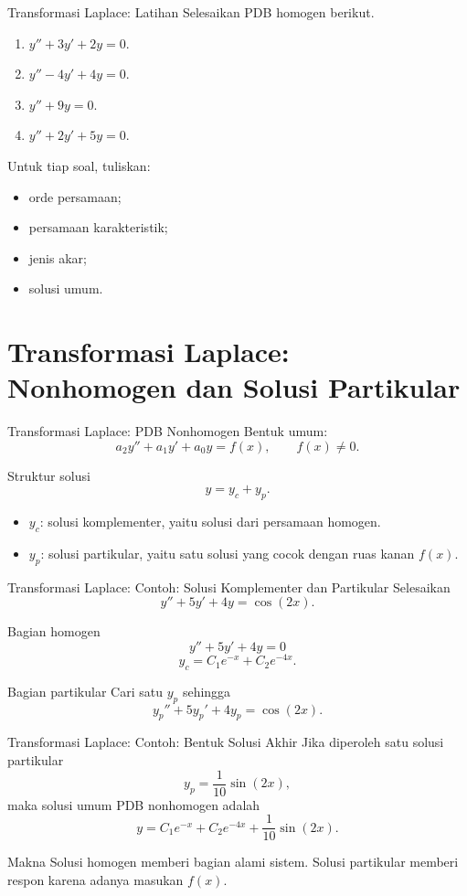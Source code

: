 \documentclass[aspectratio=169,11pt]{beamer}
\begin{document}
\begin{frame}{Transformasi Laplace: Latihan}
Selesaikan PDB homogen berikut.
\begin{enumerate}
  \item $y''+3y'+2y=0$.
  \item $y''-4y'+4y=0$.
  \item $y''+9y=0$.
  \item $y''+2y'+5y=0$.
\end{enumerate}
Untuk tiap soal, tuliskan:
\begin{itemize}
  \item orde persamaan;
  \item persamaan karakteristik;
  \item jenis akar;
  \item solusi umum.
\end{itemize}
\end{frame}

\section{Transformasi Laplace: Nonhomogen dan Solusi Partikular}

\begin{frame}{Transformasi Laplace: PDB Nonhomogen}
Bentuk umum:
\[
a_2y''+a_1y'+a_0y=f(x),\qquad f(x)\ne 0.
\]
\begin{block}{Struktur solusi}
\[
\boxed{y=y_c+y_p.}
\]
\end{block}
\begin{itemize}
  \item $y_c$: solusi komplementer, yaitu solusi dari persamaan homogen.
  \item $y_p$: solusi partikular, yaitu satu solusi yang cocok dengan ruas kanan $f(x)$.
\end{itemize}
\end{frame}

\begin{frame}{Transformasi Laplace: Contoh: Solusi Komplementer dan Partikular}
Selesaikan
\[
y''+5y'+4y=\cos(2x).
\]
\begin{block}{Bagian homogen}
\[
y''+5y'+4y=0
\]
\[
y_c=C_1e^{-x}+C_2e^{-4x}.
\]
\end{block}
\begin{block}{Bagian partikular}
Cari satu $y_p$ sehingga
\[
y_p''+5y_p'+4y_p=\cos(2x).
\]
\end{block}
\end{frame}

\begin{frame}{Transformasi Laplace: Contoh: Bentuk Solusi Akhir}
Jika diperoleh satu solusi partikular
\[
y_p=\frac{1}{10}\sin(2x),
\]
maka solusi umum PDB nonhomogen adalah
\[
\boxed{y=C_1e^{-x}+C_2e^{-4x}+\frac{1}{10}\sin(2x).}
\]
\begin{alertblock}{Makna}
Solusi homogen memberi bagian alami sistem. Solusi partikular memberi respon karena adanya masukan $f(x)$.
\end{alertblock}
\end{frame}
\end{document}
